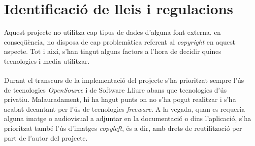 
\chapter{Identificació de lleis i regulacions} %

\label{Chapter5} %

Aquest projecte no utilitza cap tipus de dades d'alguna font externa, en conseqüència, no disposa de cap problemàtica referent al \textit{copyright}\cite{copyright} en aquest aspecte. Tot i així, s'han tingut alguns factors a l'hora de decidir quines tecnologies i media utilitzar.
\\\\
Durant el transcurs de la implementació del projecte s'ha prioritzat sempre l'ús de tecnologies \textit{OpenSource}\cite{opensource} i de Software Lliure abans que tecnologies d'ús privatiu. Malauradament, hi ha hagut punts on no s'ha pogut realitzar i s'ha acabat decantant per l'ús de tecnologies \textit{freeware}\cite{freeware}. A la vegada, quan es requeria alguna imatge o audiovisual a adjuntar en la documentació o dins l'aplicació, s'ha prioritzat també l'ús d'imatges \textit{copyleft}\cite{copyleft}, és a dir, amb drets de reutilització per part de l'autor del projecte.